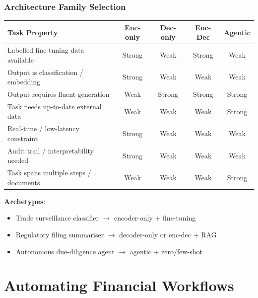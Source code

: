 \documentclass[9pt,t]{beamer}
\begin{document}
\begin{frame}
\frametitle{Architecture Family Selection}

\begin{center}
\small
\begin{tabular}{lcccc}
\toprule
\textbf{Task Property} & \textbf{Enc-only} & \textbf{Dec-only} & \textbf{Enc-Dec} & \textbf{Agentic} \\
\midrule
Labelled fine-tuning data available   & Strong & Weak   & Strong & Weak   \\
Output is classification / embedding  & Strong & Weak   & Weak   & Weak   \\
Output requires fluent generation     & Weak   & Strong & Strong & Strong \\
Task needs up-to-date external data   & Weak   & Weak   & Weak   & Strong \\
Real-time / low-latency constraint    & Strong & Weak   & Weak   & Weak   \\
Audit trail / interpretability needed & Strong & Weak   & Weak   & Weak   \\
Task spans multiple steps / documents & Weak   & Weak   & Weak   & Strong \\
\bottomrule
\end{tabular}
\end{center}

\medskip
\textbf{Archetypes}:
\begin{itemize}
  \item Trade surveillance classifier $\to$ encoder-only + fine-tuning
  \item Regulatory filing summariser $\to$ decoder-only or enc-dec + RAG
  \item Autonomous due-diligence agent $\to$ agentic + zero/few-shot
\end{itemize}
\end{frame}

\section{Automating Financial Workflows}
\end{document}
